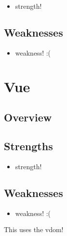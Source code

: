 \begin{itemize}
    \item strength!
\end{itemize}

\subsection{Weaknesses}
\label{subsec:experiment:react:weaknesses}

\begin{itemize}
    \item weakness! :(
\end{itemize}

\section{Vue}
\label{sec:experiment:vue}

\subsection{Overview}
\label{subsec:experiment:vue:overview}


\subsection{Strengths}
\label{subsec:experiment:vue:strengths}

\begin{itemize}
    \item strength!
\end{itemize}

\subsection{Weaknesses}
\label{subsec:experiment:vue:weaknesses}

\begin{itemize}
    \item weakness! :(
\end{itemize}

\vspace{5cm}

This uses the \acrshort{vdom}!



